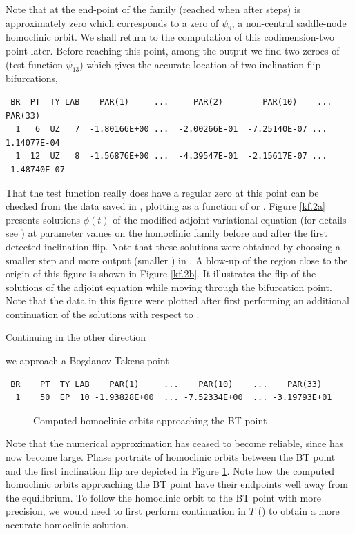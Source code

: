 \documentclass[12pt]{report}
\begin{document}
Note that at the end-point of
the family (reached when after  steps)  is
approximately zero which corresponds to a zero of $\psi_9$, a 
non-central saddle-node homoclinic orbit. We shall return to the computation of
this codimension-two point later. Before reaching this point,
among the output we find two zeroes of 
(test function $\psi_{13}$) which gives the accurate
location of two inclination-flip bifurcations,
\begin{verbatim}
 BR  PT  TY LAB    PAR(1)     ...     PAR(2)        PAR(10)    ...   PAR(33)
  1   6  UZ   7  -1.80166E+00 ...  -2.00266E-01  -7.25140E-07 ...  1.14077E-04
  1  12  UZ   8  -1.56876E+00 ...  -4.39547E-01  -2.15617E-07 ... -1.48740E-07
\end{verbatim}
That the test function really does have a regular zero at this point can
be checked from the data saved in , plotting  as
a function of  or . 
Figure \ref{kf.2a} presents solutions $\phi(t)$ of the modified adjoint 
variational equation (for details see )
at parameter values on the homoclinic 
family before and after the first detected inclination flip. 
Note that these solutions were obtained by choosing a smaller
step  and more output (smaller ) in
.
A blow-up of the region close to the origin of this 
figure is shown in Figure \ref{kf.2b}.
It illustrates the flip of the solutions of the adjoint equation while
moving through the bifurcation point. Note that the data in this
figure were plotted after first performing an additional
continuation of the solutions with respect to . 

Continuing in the other direction 
\begin{center}
\end{center}
we approach a Bogdanov-Takens point
\begin{verbatim}  
 BR    PT  TY LAB    PAR(1)     ...    PAR(10)    ...    PAR(33)    
  1    50  EP  10 -1.93828E+00  ... -7.52334E+00  ... -3.19793E+01
\end{verbatim}
\begin{figure}[t]
\epsfysize 9.0cm
\centerline{}
\caption{Computed homoclinic orbits approaching the BT point}
\label{kp.6}
\end{figure}
Note that the numerical approximation has ceased to become reliable, since 
 has now become large. 
Phase portraits of homoclinic orbits between the BT point and the first
inclination flip 
are depicted in Figure \ref{kp.6}. Note how the computed homoclinic orbits
approaching the BT point have their endpoints well away from the equilibrium.
To follow the homoclinic orbit to 
the BT point with more precision, we would need to first perform continuation 
in $T$ () to obtain a more accurate homoclinic solution.
\end{document}
